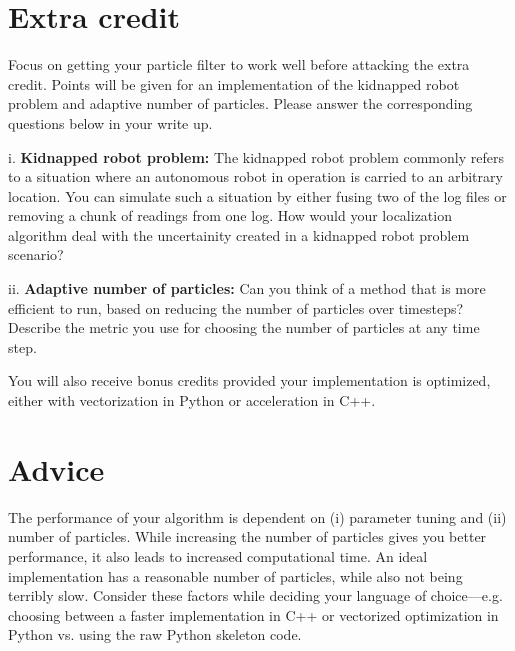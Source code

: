 \documentclass[12pt, a4paper]{article}
\begin{document}
\begin{comment}
10) motion model: implementation correctness, description 20) sensor
model: implementation correctness, description 10) resampling model:
implementation correctness, description 10) discussion of parameter
tuning 30) overall correctness (how well do combining the four work)
5) videos (we will have difficulty measuring correctness without videos)
15) write-up quality, readability, and discussion of future work EC
5 - 15 depending on quality) kidnapped robot EC 5 - 10 depending on
quality, impact) adaptive particle numbers
\end{comment}

\vspace{10pt}

\section{Extra credit}

Focus on getting your particle filter to work well before attacking
the extra credit. Points will be given for an implementation of the
kidnapped robot problem and adaptive number of particles. Please answer
the corresponding questions below in your write up.

i. \textbf{Kidnapped robot problem:} The kidnapped robot problem commonly
refers to a situation where an autonomous robot in operation is carried
to an arbitrary location. You can simulate such a situation by either
fusing two of the log files or removing a chunk of readings from one
log. How would your localization algorithm deal with the uncertainity
created in a kidnapped robot problem scenario?

ii. \textbf{Adaptive number of particles:} Can you think of a method
that is more efficient to run, based on reducing the number of particles
over timesteps? Describe the metric you use for choosing the number
of particles at any time step.

You will also receive bonus credits provided your implementation is optimized, either with vectorization in Python or acceleration in C++.

\section{Advice}

The performance of your algorithm is dependent on (i) parameter tuning
and (ii) number of particles. While increasing the number of particles
gives you better performance, it also leads to increased computational
time. An ideal implementation has a reasonable number of particles,
while also not being terribly slow. Consider these factors while deciding
your language of choice---e.g. choosing between a faster implementation
in C++ or vectorized optimization in Python vs. using the raw Python skeleton code.



\end{document}
